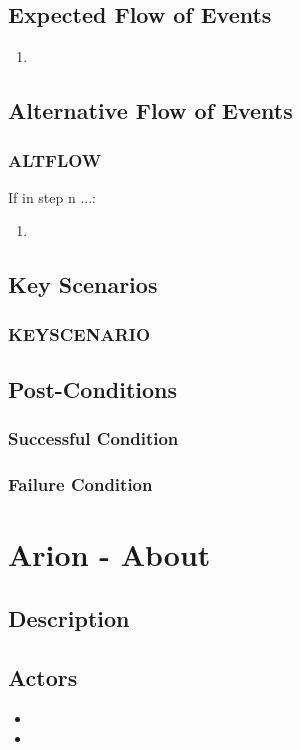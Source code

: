 \documentclass{scrreprt}
\begin{document}
\section{Expected Flow of Events}
\begin{enumerate}[1.]
    \item 
\end{enumerate}

\section{Alternative Flow of Events}

    \subsection{ALTFLOW}
    If in step n ...:
    \begin{enumerate}
        \item 
    \end{enumerate}

\section{Key Scenarios}
    \subsection{KEYSCENARIO}

\section{Post-Conditions}
    \subsection{Successful Condition}
    
    \subsection{Failure Condition}


\chapter{Arion - About}

\section{Description}

\section{Actors}
\begin{itemize}
    \item 
    \item 
\end{itemize}
\end{document}
